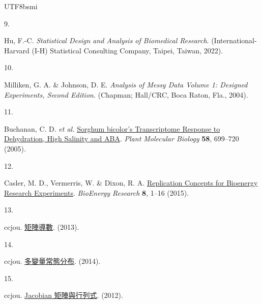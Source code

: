 \documentclass[
]{book}
\newlength{\cslhangindent}
\newlength{\csllabelwidth}
\newenvironment{CSLReferences}[2] %
 {\begin{list}{}{%
  \setlength{\itemindent}{0pt}
  \setlength{\leftmargin}{0pt}
  \setlength{\parsep}{0pt}
  \ifodd #1
   \setlength{\leftmargin}{\cslhangindent}
   \setlength{\itemindent}{-1\cslhangindent}
  \fi
  \setlength{\itemsep}{#2\baselineskip}}}
 {\end{list}}
\newcommand{\CSLLeftMargin}[1]{\parbox[t]{\csllabelwidth}{\strut#1\strut}}
\newcommand{\CSLRightInline}[1]{\parbox[t]{\linewidth - \csllabelwidth}{\strut#1\strut}}
\theoremstyle{definition}
\theoremstyle{definition}
\theoremstyle{definition}
\theoremstyle{definition}
\theoremstyle{remark}
\begin{document}
\begin{CJK}{UTF8}{bsmi}
\begin{CSLReferences}{0}{0}
\CSLLeftMargin{9. }%
\CSLRightInline{Hu, F.-C. \emph{Statistical Design and Analysis of Biomedical Research}. (International-Harvard (I-H) Statistical Consulting Company, Taipei, Taiwan, 2022).}

\CSLLeftMargin{10. }%
\CSLRightInline{Milliken, G. A. \& Johnson, D. E. \emph{Analysis of Messy Data Volume 1: Designed Experiments, Second Edition}. (Chapman; Hall/CRC, Boca Raton, Fla., 2004).}

\CSLLeftMargin{11. }%
\CSLRightInline{Buchanan, C. D. \emph{et al.} \href{https://doi.org/10.1007/s11103-005-7876-2}{Sorghum bicolor{'}s Transcriptome Response to Dehydration, High Salinity and ABA}. \emph{Plant Molecular Biology} \textbf{58}, 699--720 (2005).}

\CSLLeftMargin{12. }%
\CSLRightInline{Casler, M. D., Vermerris, W. \& Dixon, R. A. \href{https://doi.org/10.1007/s12155-015-9580-7}{Replication Concepts for Bioenergy Research Experiments}. \emph{BioEnergy Research} \textbf{8}, 1--16 (2015).}

\CSLLeftMargin{13. }%
\CSLRightInline{ccjou. \href{https://ccjou.wordpress.com/2013/05/31/\%e7\%9f\%a9\%e9\%99\%a3\%e5\%b0\%8e\%e6\%95\%b8/}{矩陣導數}. (2013).}

\CSLLeftMargin{14. }%
\CSLRightInline{ccjou. \href{https://ccjou.wordpress.com/2014/06/05/\%e5\%a4\%9a\%e8\%ae\%8a\%e9\%87\%8f\%e5\%b8\%b8\%e6\%85\%8b\%e5\%88\%86\%e5\%b8\%83/}{多變量常態分布}. (2014).}

\CSLLeftMargin{15. }%
\CSLRightInline{ccjou. \href{https://ccjou.wordpress.com/2012/11/26/jacobian-\%e7\%9f\%a9\%e9\%99\%a3\%e8\%88\%87\%e8\%a1\%8c\%e5\%88\%97\%e5\%bc\%8f/}{Jacobian 矩陣與行列式}. (2012).}

\end{CSLReferences}
\end{CJK}
\end{document}
